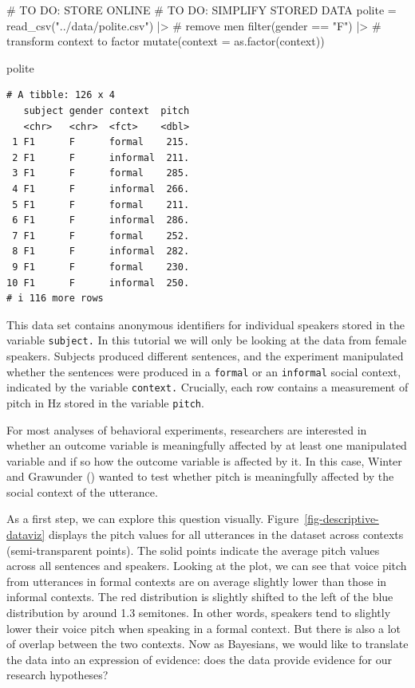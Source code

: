 \documentclass[
  doc,
  floatsintext,
  longtable,
  nolmodern,
  notxfonts,
  notimes,
  colorlinks=true,linkcolor=blue,citecolor=blue,urlcolor=blue]{apa7}
\newenvironment{Shaded}{\begin{snugshade}}{\end{snugshade}}
\newcommand{\AttributeTok}[1]{\textcolor[rgb]{0.40,0.45,0.13}{#1}}
\newcommand{\CommentTok}[1]{\textcolor[rgb]{0.37,0.37,0.37}{#1}}
\newcommand{\FunctionTok}[1]{\textcolor[rgb]{0.28,0.35,0.67}{#1}}
\newcommand{\NormalTok}[1]{\textcolor[rgb]{0.00,0.23,0.31}{#1}}
\newcommand{\OtherTok}[1]{\textcolor[rgb]{0.00,0.23,0.31}{#1}}
\newcommand{\SpecialCharTok}[1]{\textcolor[rgb]{0.37,0.37,0.37}{#1}}
\newcommand{\StringTok}[1]{\textcolor[rgb]{0.13,0.47,0.30}{#1}}
\begin{document}
\begin{Shaded}
\begin{Highlighting}[]
\CommentTok{\# TO DO: STORE ONLINE}
\CommentTok{\# TO DO: SIMPLIFY STORED DATA}
\NormalTok{polite }\OtherTok{=} \FunctionTok{read\_csv}\NormalTok{(}\StringTok{"../data/polite.csv"}\NormalTok{) }\SpecialCharTok{|\textgreater{}} 
  \CommentTok{\# remove men}
  \FunctionTok{filter}\NormalTok{(gender }\SpecialCharTok{==} \StringTok{"F"}\NormalTok{) }\SpecialCharTok{|\textgreater{}} 
  \CommentTok{\# transform context to factor}
  \FunctionTok{mutate}\NormalTok{(}\AttributeTok{context =} \FunctionTok{as.factor}\NormalTok{(context))}

\NormalTok{polite}
\end{Highlighting}
\end{Shaded}

\begin{verbatim}
# A tibble: 126 x 4
   subject gender context  pitch
   <chr>   <chr>  <fct>    <dbl>
 1 F1      F      formal    215.
 2 F1      F      informal  211.
 3 F1      F      formal    285.
 4 F1      F      informal  266.
 5 F1      F      formal    211.
 6 F1      F      informal  286.
 7 F1      F      formal    252.
 8 F1      F      informal  282.
 9 F1      F      formal    230.
10 F1      F      informal  250.
# i 116 more rows
\end{verbatim}

This data set contains anonymous identifiers for individual speakers
stored in the variable \texttt{subject.} In this tutorial we will only
be looking at the data from female speakers. Subjects produced diﬀerent
sentences, and the experiment manipulated whether the sentences were
produced in a \texttt{formal} or an \texttt{informal} social context,
indicated by the variable \texttt{context.} Crucially, each row contains
a measurement of pitch in Hz stored in the variable \texttt{pitch}.

For most analyses of behavioral experiments, researchers are interested
in whether an outcome variable is meaningfully affected by at least one
manipulated variable and if so how the outcome variable is affected by
it. In this case, Winter and Grawunder
()
wanted to test whether pitch is meaningfully affected by the social
context of the utterance.

As a first step, we can explore this question visually.
Figure~\ref{fig-descriptive-dataviz} displays the pitch values for all
utterances in the dataset across contexts (semi-transparent points). The
solid points indicate the average pitch values across all sentences and
speakers. Looking at the plot, we can see that voice pitch from
utterances in formal contexts are on average slightly lower than those
in informal contexts. The red distribution is slightly shifted to the
left of the blue distribution by around 1.3 semitones. In other words,
speakers tend to slightly lower their voice pitch when speaking in a
formal context. But there is also a lot of overlap between the two
contexts. Now as Bayesians, we would like to translate the data into an
expression of evidence: does the data provide evidence for our research
hypotheses?
\end{document}

